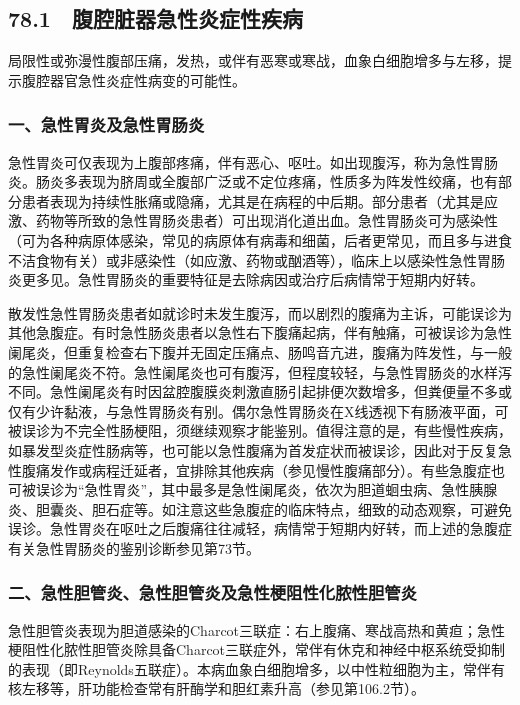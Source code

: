\subsection{78.1　腹腔脏器急性炎症性疾病}

局限性或弥漫性腹部压痛，发热，或伴有恶寒或寒战，血象白细胞增多与左移，提示腹腔器官急性炎症性病变的可能性。

\subsubsection{一、急性胃炎及急性胃肠炎}

急性胃炎可仅表现为上腹部疼痛，伴有恶心、呕吐。如出现腹泻，称为急性胃肠炎。肠炎多表现为脐周或全腹部广泛或不定位疼痛，性质多为阵发性绞痛，也有部分患者表现为持续性胀痛或隐痛，尤其是在病程的中后期。部分患者（尤其是应激、药物等所致的急性胃肠炎患者）可出现消化道出血。急性胃肠炎可为感染性（可为各种病原体感染，常见的病原体有病毒和细菌，后者更常见，而且多与进食不洁食物有关）或非感染性（如应激、药物或酗酒等），临床上以感染性急性胃肠炎更多见。急性胃肠炎的重要特征是去除病因或治疗后病情常于短期内好转。

散发性急性胃肠炎患者如就诊时未发生腹泻，而以剧烈的腹痛为主诉，可能误诊为其他急腹症。有时急性肠炎患者以急性右下腹痛起病，伴有触痛，可被误诊为急性阑尾炎，但重复检查右下腹并无固定压痛点、肠鸣音亢进，腹痛为阵发性，与一般的急性阑尾炎不符。急性阑尾炎也可有腹泻，但程度较轻，与急性胃肠炎的水样泻不同。急性阑尾炎有时因盆腔腹膜炎刺激直肠引起排便次数增多，但粪便量不多或仅有少许黏液，与急性胃肠炎有别。偶尔急性胃肠炎在X线透视下有肠液平面，可被误诊为不完全性肠梗阻，须继续观察才能鉴别。值得注意的是，有些慢性疾病，如暴发型炎症性肠病等，也可能以急性腹痛为首发症状而被误诊，因此对于反复急性腹痛发作或病程迁延者，宜排除其他疾病（参见慢性腹痛部分）。有些急腹症也可被误诊为“急性胃炎”，其中最多是急性阑尾炎，依次为胆道蛔虫病、急性胰腺炎、胆囊炎、胆石症等。如注意这些急腹症的临床特点，细致的动态观察，可避免误诊。急性胃炎在呕吐之后腹痛往往减轻，病情常于短期内好转，而上述的急腹症有关急性胃肠炎的鉴别诊断参见第73节。

\subsubsection{二、急性胆管炎、急性胆管炎及急性梗阻性化脓性胆管炎}

急性胆管炎表现为胆道感染的Charcot三联症：右上腹痛、寒战高热和黄疸；急性梗阻性化脓性胆管炎除具备Charcot三联症外，常伴有休克和神经中枢系统受抑制的表现（即Reynolds五联症）。本病血象白细胞增多，以中性粒细胞为主，常伴有核左移等，肝功能检查常有肝酶学和胆红素升高（参见第106.2节）。

